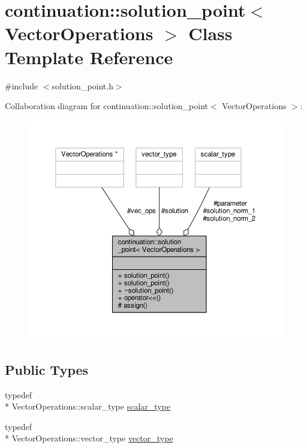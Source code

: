 \hypertarget{classcontinuation_1_1solution__point}{\section{continuation\-:\-:solution\-\_\-point$<$ Vector\-Operations $>$ Class Template Reference}
\label{classcontinuation_1_1solution__point}
}


{\ttfamily \#include $<$solution\-\_\-point.\-h$>$}



Collaboration diagram for continuation\-:\-:solution\-\_\-point$<$ Vector\-Operations $>$\-:\nopagebreak
\begin{figure}[H]
\begin{center}
\leavevmode
\includegraphics[width=350pt]{classcontinuation_1_1solution__point__coll__graph}
\end{center}
\end{figure}
\subsection*{Public Types}
\begin{DoxyCompactItemize}
\item 
typedef \\*
Vector\-Operations\-::scalar\-\_\-type \hyperlink{classcontinuation_1_1solution__point_aa3e601aeccb1c0fd6faebd835f1e92db}{scalar\-\_\-type}
\item 
typedef \\*
Vector\-Operations\-::vector\-\_\-type \hyperlink{classcontinuation_1_1solution__point_a6c3692e61ce44b2ac89223c0f6db2895}{vector\-\_\-type}
\end{DoxyCompactItemize}

